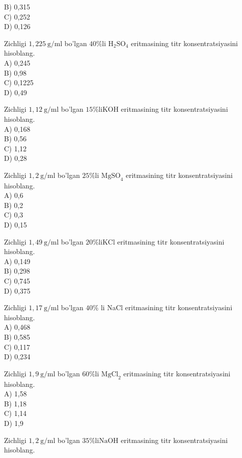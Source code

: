 B) 0,315\\
C) 0,252\\
D) 0,126
  \item Zichligi $1,225 \mathrm{~g} / \mathrm{ml}$ bo'lgan $40 \% \mathrm{li}$ $\mathrm{H}_{2} \mathrm{SO}_{4}$ eritmasining titr konsentratsiyasini hisoblang.\\
A) 0,245\\
B) 0,98\\
C) 0,1225\\
D) 0,49
  \item Zichligi $1,12 \mathrm{~g} / \mathrm{ml}$ bo'lgan $15 \% \mathrm{li} \mathrm{KOH}$ eritmasining titr konsentratsiyasini hisoblang.\\
A) 0,168\\
B) 0,56\\
C) 1,12\\
D) 0,28
  \item Zichligi $1,2 \mathrm{~g} / \mathrm{ml}$ bo'lgan $25 \% \mathrm{li}$ $\mathrm{MgSO}_{4}$ eritmasining titr konsentratsiyasini hisoblang.\\
A) 0,6\\
B) 0,2\\
C) 0,3\\
D) 0,15
  \item Zichligi $1,49 \mathrm{~g} / \mathrm{ml}$ bo'lgan $20 \% \mathrm{li} \mathrm{KCl}$ eritmasining titr konsentratsiyasini hisoblang.\\
A) 0,149\\
B) 0,298\\
C) 0,745\\
D) 0,375
  \item Zichligi $1,17 \mathrm{~g} / \mathrm{ml}$ bo'lgan $40 \%$ li NaCl eritmasining titr konsentratsiyasini hisoblang.\\
A) 0,468\\
B) 0,585\\
C) 0,117\\
D) 0,234
  \item Zichligi $1,9 \mathrm{~g} / \mathrm{ml}$ bo'lgan $60 \% \mathrm{li}$ $\mathrm{MgCl}_{2}$ eritmasining titr konsentratsiyasini hisoblang.\\
A) 1,58\\
B) 1,18\\
C) 1,14\\
D) 1,9
  \item Zichligi $1,2 \mathrm{~g} / \mathrm{ml}$ bo'lgan $35 \% \mathrm{li} \mathrm{NaOH}$ eritmasining titr konsentratsiyasini hisoblang.\\
